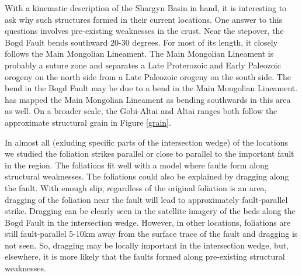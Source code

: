 	With a kinematic description of the Shargyn Basin in hand, it is interesting to ask why such structures formed in their current locations. One answer to this questions involves pre-existing weaknesses in the crust. Near the stepover, the Bogd Fault bends southward 20-30 degrees. For most of its length, it closely follows the Main Mongolian Lineament. The Main Mongolian Lineament is probably a suture zone and separates a Late Proterozoic and Early Paleozoic orogeny on the north side from a Late Paleozoic orogeny on the south side. The bend in the Bogd Fault may be due to a bend in the Main Mongolian Lineament. \citet{Windley2007} has mapped the Main Mongolian Lineament as bending southwards in this area as well. On a broader scale, the Gobi-Altai and Altai ranges both follow the approximate structural grain in Figure \ref{grain}.
	
	In almost all (exluding specific parts of the intersection wedge) of the locations we studied the foliation strikes parallel or close to parallel to the important fault in the region. The foliations fit well with a model where faults form along structural weaknesses. The foliations could also be explained by dragging along the fault. With enough slip, regardless of the original foliation is an area, dragging of the foliation near the fault will lead to approximately fault-parallel strike. Dragging can be clearly seen in the satellite imagery of the beds along the Bogd Fault in the intersection wedge. However, in other locations, foliations are still fault-parallel 5-10km away from the surface trace of the fault and dragging is not seen. So, dragging may be locally important in the intersection wedge, but, elsewhere, it is more likely that the faults formed along pre-existing structural weaknesses.
